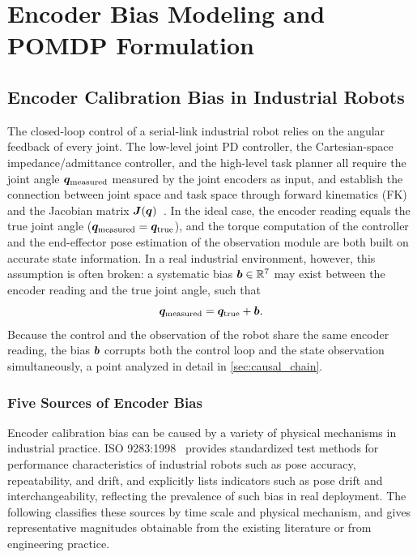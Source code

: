 
\chapter{Encoder Bias Modeling and POMDP Formulation}\label{ch:problem_formulation}

\section{Encoder Calibration Bias in Industrial Robots}\label{sec:bias_sources}

The closed-loop control of a serial-link industrial robot relies on the angular feedback of every joint. The low-level joint PD controller, the Cartesian-space impedance/admittance controller, and the high-level task planner all require the joint angle $\bm{q}_{\text{measured}}$ measured by the joint encoders as input, and establish the connection between joint space and task space through forward kinematics (FK) and the Jacobian matrix $\bm{J}(\bm{q})$~\cite{siciliano2010robotics}. In the ideal case, the encoder reading equals the true joint angle ($\bm{q}_{\text{measured}} = \bm{q}_{\text{true}}$), and the torque computation of the controller and the end-effector pose estimation of the observation module are both built on accurate state information. In a real industrial environment, however, this assumption is often broken: a systematic bias $\bm{b} \in \mathbb{R}^7$ may exist between the encoder reading and the true joint angle, such that
\begin{equation}
  \bm{q}_{\text{measured}} = \bm{q}_{\text{true}} + \bm{b}.
  \label{eq:encoder_bias}
\end{equation}
Because the control and the observation of the robot share the same encoder reading, the bias $\bm{b}$ corrupts both the control loop and the state observation simultaneously, a point analyzed in detail in \cref{sec:causal_chain}.

\subsection*{Five Sources of Encoder Bias}

Encoder calibration bias can be caused by a variety of physical mechanisms in industrial practice. ISO 9283:1998~\cite{iso9283} provides standardized test methods for performance characteristics of industrial robots such as pose accuracy, repeatability, and drift, and explicitly lists indicators such as pose drift and interchangeability, reflecting the prevalence of such bias in real deployment. The following classifies these sources by time scale and physical mechanism, and gives representative magnitudes obtainable from the existing literature or from engineering practice.

